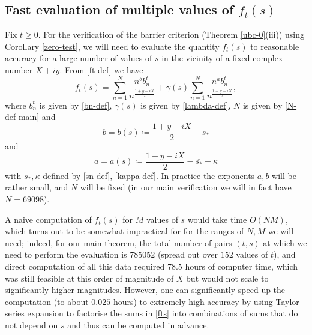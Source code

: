 \subsection{Fast evaluation of multiple values of $f_t(s)$}\label{Fast}

Fix $t \geq 0$.  For the verification of the barrier criterion (Theorem \ref{ubc-0}(iii)) using Corollary \ref{zero-test}, we will need to evaluate the quantity $f_t(s)$ to reasonable accuracy for a large number of values of $s$ in the vicinity of a fixed complex number $X+iy$.  From \eqref{ft-def} we have
\begin{equation}\label{fts}
f_t(s) = \sum_{n=1}^N \frac{n^b b_n^t}{n^{\frac{1+y-iX}{2}}} + \gamma(s) \sum_{n=1}^N \frac{n^a b_n^t}{n^{\frac{1-y+iX}{2}}},
\end{equation}
where $b_n^t$ is given by \eqref{bn-def}, $\gamma(s)$ is given by \eqref{lambda-def}, $N$ is given by \eqref{N-def-main} and
$$ b = b(s) \coloneqq  \frac{1+y-iX}{2} - s_* $$
and
$$ a = a(s) \coloneqq  \frac{1-y-iX}{2} - \overline{s_*} - \kappa$$
with $s_*, \kappa$ defined by \eqref{sn-def}, \eqref{kappa-def}.  In practice the exponents $a,b$ will be rather small, and $N$ will be fixed (in our main verification we will in fact have $N = 69098$).

A naive computation of $f_t(s)$ for $M$ values of $s$ would take time $O(NM)$, which turns out to be somewhat impractical for for the ranges of $N,M$ we will need; indeed, for our main theorem, the total number of pairs $(t,s)$ at which we need to perform the evaluation is $785052$ (spread out over $152$ values of $t$), and direct computation of all this data required $78.5$ hours of computer time, which was still feasible at this order of magnitude of $X$ but would not scale to significantly higher magnitudes.  However, one can significantly speed up the computation (to about $0.025$ hours) to extremely high accuracy by using Taylor series expansion to factorise the sums in \eqref{fts} into combinations of sums that do not depend on $s$ and thus can be computed in advance.


